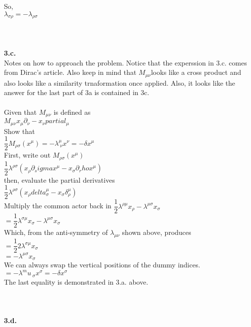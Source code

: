\documentclass[prb,preprint]
{revtex4-1}
\newcommand{\PRLsep}{\noindent\makebox[\linewidth]{\resizebox{0.8888\linewidth}{2pt}{$\bullet$}}\bigskip}
\begin{document}
So, 
\\
$\lambda_{\sigma\rho} = -\lambda_{\rho\sigma}$
\\
\\
\PRLsep
\\
\\
\newpage
\textbf{3.c.}
\\
Notes on how to approach the problem.  Notice that the experssion in 3.c. comes from Dirac's article.  Also keep in mind that $M_{\mu\nu}$looks like a cross product and also looks like a similarity trnaformation once applied.  Also, it looks like the answer for the last part of 3a is contained in 3c. 
\\
\\
Given that $M_{\mu\nu}$ is defined as 
\\
$M_{\mu\nu} x_\mu\partial_\nu - x_\nu partial_\mu$
\\
Show that 
\\
$\dfrac{1}{2} M_{\rho\sigma}\left(x^\mu\right) = -\lambda^\mu_{\;\nu} x^\nu = -\delta x^\mu$
\\
First, write out $M_{\rho\sigma}\left(x^\mu\right)$
\\
$\dfrac{1}{2}\lambda^{\rho\sigma}\left(x_\rho \partial_sigma x^\mu - x_\sigma \partial_rho x^\mu\right)$
\\
then, evaluate the partial derivatives
\\
$\dfrac{1}{2}\lambda^{\rho\sigma}\left(x_\rho delta^\mu_\sigma - x_\sigma \delta^\mu_\rho\right)$
\\
Multiply the common actor back in
$\dfrac{1}{2}\lambda^{\rho\mu} x_\rho - \lambda^{\mu\sigma} x_\sigma$
\\
$= \dfrac{1}{2}\lambda^{\sigma\mu}x_\sigma - \lambda^{\mu\sigma}x_\sigma$
\\
Which, from the anti-symmetry of $\lambda_{\mu\nu}$ shown above, produces
\\
$=\dfrac{1}{2}2\lambda^{\sigma\mu} x_\sigma$
\\
$=-\lambda^{\mu\sigma} x_\sigma$
\\
We can always swap the vertical positions of the dummy indices.
\\
$=-\lambda^mu_{\;\sigma} x^\sigma = -\delta x^\sigma$
\\
The last equality is demonstrated in 3.a. above.
\\
\\
\PRLsep
\\
\\
\newpage
\textbf{3.d.}
\\
\end{document}
